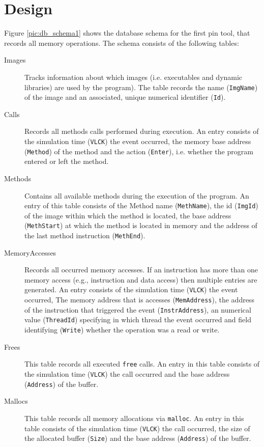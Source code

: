 \section{Design}

Figure \ref{pic:db_schema1} shows the database schema for the first
pin tool, that records all memory operations. The schema consists of
the following tables:
\begin{description}
  \item[Images] Tracks information about which images
    (i.e. executables and dynamic libraries) are used by the
    program). The table records the name (\texttt{ImgName}) of the
    image and an associated, unique numerical identifier
    (\texttt{Id}).
  \item[Calls] Records all methods calls performed during
    execution. An entry consists of the simulation time
    (\texttt{VLCK}) the event occurred, the memory base address
    (\texttt{Method}) of the method and the action (\texttt{Enter}),
    i.e. whether the program entered or left the method.
  \item[Methods] Contains all available methods during the execution
    of the program. An entry of this table consists of the Method name
    (\texttt{MethName}), the id (\texttt{ImgId}) of the image within
    which the method is located, the base address (\texttt{MethStart})
    at which the method is located in memory and the address of the
    last method instruction (\texttt{MethEnd}).
  \item[MemoryAccesses] Records all occurred memory accesses. If an
    instruction has more than one memory access (e.g., instruction and
    data access) then multiple entries are generated. An entry
    consists of the simulation time (\texttt{VLCK}) the event
    occurred, The memory address that is accesses
    (\texttt{MemAddress}), the address of the instruction that
    triggered the event (\texttt{InstrAddress}), an numerical value
    (\texttt{ThreadId}) specifying in which thread the event occurred
    and field identifying (\texttt{Write}) whether the operation was a
    read or write.
  \item[Frees] This table records all executed \texttt{free} calls. An
    entry in this table consists of the simulation time
    (\texttt{VLCK}) the call occurred and the base address
    (\texttt{Address}) of the buffer.
  \item[Mallocs] This table records all memory allocations via
    \texttt{malloc}. An entry in this table consists of the simulation
    time (\texttt{VLCK}) the call occurred, the size of the allocated
    buffer (\texttt{Size}) and the base address (\texttt{Address}) of
    the buffer.
\end{description}

